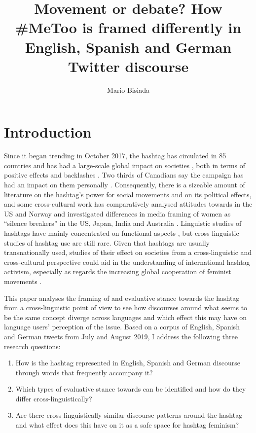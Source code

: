 \documentclass[output=paper,english,spanish,german,english]{langsci/langscibook}
\author{Mario Bisiada\affiliation{Universitat Pompeu Fabra}}
\title[How \#MeToo is framed differently in Twitter discourse across languages]{Movement or debate? How \#MeToo is framed differently in English, Spanish and German Twitter discourse}
\begin{document}
\maketitle

\section{Introduction}

Since it began trending in October 2017, the \mt hashtag has circulated in 85 countries \parencite[1317]{gilorg18} and has had a large-scale global impact on societies \parencite{zardav18}, both in terms of positive effects \parencite{fillon19} and backlashes \parencite{boyrat19}. Two thirds of Canadians say the \mt campaign has had an impact on them personally \parencite{reid18}. Consequently, there is a sizeable amount of literature on the hashtag's power for social movements and on its political effects, and some cross-cultural work has comparatively analysed attitudes towards \mt in the US and Norway \parencite{kunetal18} and investigated differences in media framing of women as \enquote{silence breakers} in the US, Japan, India and Australia \parencite{staetal19}. Linguistic studies of hashtags have mainly concentrated on functional aspects \parencite[see][7]{zappavigna18}, but cross-linguistic studies of hashtag use are still rare. Given that hashtags are usually transnationally used, studies of their effect on societies from a cross-linguistic and cross-cultural perspective could aid in the understanding of international hashtag activism, especially as regards the increasing global cooperation of feminist movements \parencites{huelga}{oppenheim18}[186]{garhop19}.

This paper analyses the framing of and evaluative stance towards the \mt hashtag from a cross-linguistic point of view to see how discourses around what seems to be the same concept diverge across languages and which effect this may have on language users' perception of the issue. Based on a corpus of English, Spanish and German tweets from July and August 2019, I address the following three research questions:

\begin{enumerate}
  \item How is the \mt hashtag represented in English, Spanish and German discourse through words that frequently accompany it?
  \item Which types of evaluative stance towards \mt can be identified and how do they differ cross-linguistically?
  \item Are there cross-linguistically similar discourse patterns around the \mt hashtag and what effect does this have on it as a safe space for hashtag feminism?
\end{enumerate}
\end{document}
